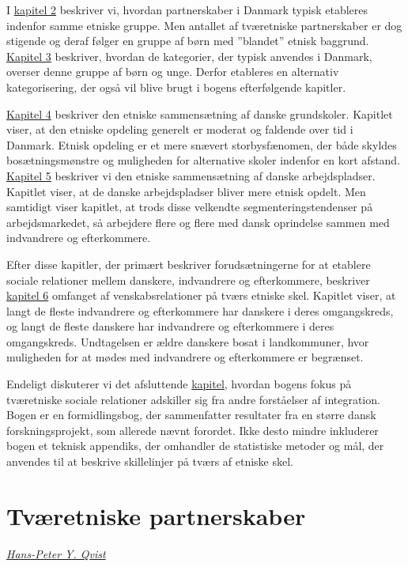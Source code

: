 \documentclass[
]{book}
\begin{document}
I \hyperref[kap2]{kapitel 2} beskriver vi, hvordan partnerskaber i Danmark typisk etableres indenfor samme etniske gruppe. Men antallet af tværetniske partnerskaber er dog stigende og deraf følger en gruppe af børn med ''blandet'' etnisk baggrund. \hyperref[kap3]{Kapitel 3} beskriver, hvordan de kategorier, der typisk anvendes i Danmark, overser denne gruppe af børn og unge. Derfor etableres en alternativ kategorisering, der også vil blive brugt i bogens efterfølgende kapitler.

\hyperref[kap4]{Kapitel 4} beskriver den etniske sammensætning af danske grundskoler. Kapitlet viser, at den etniske opdeling generelt er moderat og faldende over tid i Danmark. Etnisk opdeling er et mere snævert storbysfænomen, der både skyldes bosætningsmønstre og muligheden for alternative skoler indenfor en kort afstand. \hyperref[kap5]{Kapitel 5} beskriver vi den etniske sammensætning af danske arbejdspladser. Kapitlet viser, at de danske arbejdspladser bliver mere etnisk opdelt. Men samtidigt viser kapitlet, at trods disse velkendte segmenteringstendenser på arbejdsmarkedet, så arbejdere flere og flere med dansk oprindelse sammen med indvandrere og efterkommere.

Efter disse kapitler, der primært beskriver forudsætningerne for at etablere sociale relationer mellem danskere, indvandrere og efterkommere, beskriver \hyperref[kap6]{kapitel 6} omfanget af venskabsrelationer på tværs etniske skel. Kapitlet viser, at langt de fleste indvandrere og efterkommere har danskere i deres omgangskreds, og langt de fleste danskere har indvandrere og efterkommere i deres omgangskreds. Undtagelsen er ældre danskere bosat i landkommuner, hvor muligheden for at mødes med indvandrere og efterkommere er begrænset.

Endeligt diskuterer vi det afsluttende \hyperref[kap7]{kapitel}, hvordan bogens fokus på tværetniske sociale relationer adskiller sig fra andre forståelser af integration. Bogen er en formidlingsbog, der sammenfatter resultater fra en større dansk forskningsprojekt, som allerede nævnt forordet. Ikke desto mindre inkluderer bogen et teknisk appendiks, der omhandler de statistiske metoder og mål, der anvendes til at beskrive skillelinjer på tværs af etniske skel.

\chapter{Tværetniske partnerskaber}\label{kap2}

\emph{\href{https://vbn.aau.dk/da/persons/hpq}{Hans-Peter Y. Qvist}}
\end{document}

